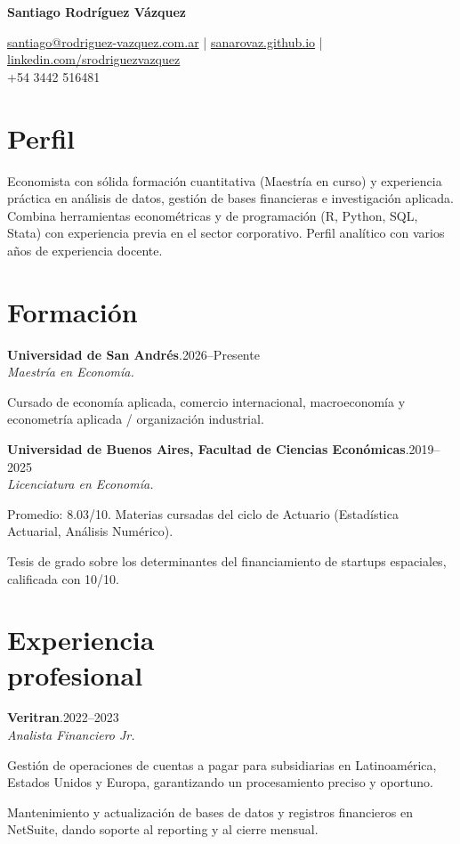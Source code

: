 \documentclass[11pt]{article}
\newcommand{\cvname}{Santiago Rodríguez Vázquez}
\newcommand{\entrydate}[1]{\hfill{\small{#1}}}
\begin{document}
\thispagestyle{firstpage}

{\LARGE\bfseries {\cvname}}

\href{mailto:santiago@rodriguez-vazquez.com.ar}{santiago@rodriguez-vazquez.com.ar} | \href{https://sanarovaz.github.io}{sanarovaz.github.io} | \href{https://www.linkedin.com/in/srodriguezvazquez/?locale=en-US}{linkedin.com/srodriguezvazquez}
\\
+54 3442 516481

\section{Perfil}
Economista con sólida formación cuantitativa (Maestría en curso) y experiencia práctica en análisis de datos, gestión de bases financieras e investigación aplicada. Combina herramientas econométricas y de programación (R, Python, SQL, Stata) con experiencia previa en el sector corporativo. Perfil analítico con varios años de experiencia docente.

\section{Formación}
\textbf{Universidad de San Andrés}.\entrydate{2026--Presente}\\
\textit{Maestría en Economía.}
\begin{cvitems}
  \item Cursado de economía aplicada, comercio internacional, macroeconomía y econometría aplicada / organización industrial.
\end{cvitems}

\smallskip
\textbf{Universidad de Buenos Aires, Facultad de Ciencias Económicas}.\entrydate{2019--2025}\\
\textit{Licenciatura en Economía.}
\begin{cvitems}
  \item Promedio: 8.03/10. Materias cursadas del ciclo de Actuario (Estadística Actuarial, Análisis Numérico).
  \item Tesis de grado sobre los determinantes del financiamiento de startups espaciales, calificada con 10/10.
\end{cvitems}

\section{Experiencia\\profesional}
\textbf{Veritran}.\entrydate{2022--2023}\\
\textit{Analista Financiero Jr.}
\begin{cvitems}
  \item Gestión de operaciones de cuentas a pagar para subsidiarias en Latinoamérica, Estados Unidos y Europa, garantizando un procesamiento preciso y oportuno.
  \item Mantenimiento y actualización de bases de datos y registros financieros en NetSuite, dando soporte al reporting y al cierre mensual.
\end{cvitems}
\end{document}
